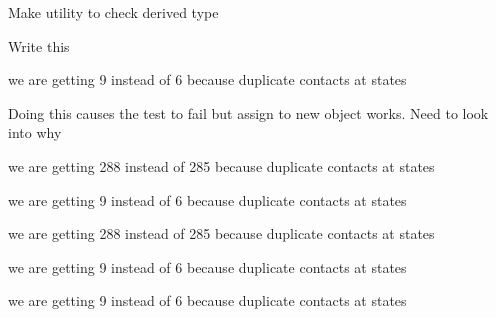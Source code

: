 \begin{DoxyRefList}
%
Make utility to check derived type  
\item[Member \mbox{\hyperlink{structtesseract__srdf_1_1KinematicsInformation_a01c585cf7e69817aadcbd5239d04e253}{tesseract\+\_\+srdf\+::Kinematics\+Information\+::operator==}} (const \mbox{\hyperlink{structtesseract__srdf_1_1KinematicsInformation}{Kinematics\+Information}} \&rhs) const]\label{todo__todo000025}%
%
Write this  
\item[Member \mbox{\hyperlink{tesseract__environment__unit_8cpp_a0d0135e86e53fd517ae04252a6fd398c}{TEST}} (Tesseract\+Environment\+Unit, check\+Trajectory\+Unit)]\label{todo__todo000017}%
%
we are getting 9 instead of 6 because duplicate contacts at states  
\item[Member \mbox{\hyperlink{tesseract__scene__graph__unit_8cpp_a07e5d7fb0413d0780df4b637bcd35845}{TEST}} (Tesseract\+Scene\+Graph\+Unit, Tesseract\+Scene\+Graph\+Remove\+Link\+Unit)]\label{todo__todo000024}%
%
Doing this causes the test to fail but assign to new object works. Need to look into why  
\item[Member \mbox{\hyperlink{tesseract__environment__unit_8cpp_a0d0135e86e53fd517ae04252a6fd398c}{TEST}} (Tesseract\+Environment\+Unit, check\+Trajectory\+Unit)]\label{todo__todo000018}%
%
we are getting 288 instead of 285 because duplicate contacts at states 

\label{todo__todo000016}%
%
we are getting 9 instead of 6 because duplicate contacts at states 

\label{todo__todo000015}%
%
we are getting 288 instead of 285 because duplicate contacts at states 

\label{todo__todo000014}%
%
we are getting 9 instead of 6 because duplicate contacts at states 

\label{todo__todo000013}%
%
we are getting 9 instead of 6 because duplicate contacts at states 


\end{DoxyRefList}
